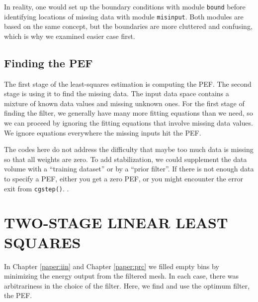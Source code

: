 \par
In reality, one would set up the boundary conditions
with module
\texttt{bound}
before identifying locations of missing data
with module
\texttt{misinput}.
Both modules are based on the same concept,
but the boundaries are more cluttered and confusing,
which is why we examined easier case first.


\subsection{Finding the PEF}

\par
The first stage of the least-squares estimation
is computing the PEF.
The second stage is using it to find the missing data.
The input data space contains a mixture of known data values
and missing unknown ones.
For the first stage of finding the filter,
we generally have many more fitting equations than we need,
so we can proceed by ignoring the fitting equations
that involve missing data values.
We ignore equations everywhere the missing inputs hit the PEF.

\par
The codes here do not address the difficulty that maybe
too much data is missing so that all weights are zero.
To add stabilization, we could supplement the data volume
with a ``training dataset''
or by a ``prior filter''.
If there is not enough data to specify a PEF,
either you get a zero PEF,
or you might encounter the error exit from \texttt{cgstep()}.
.




\section{TWO-STAGE LINEAR LEAST SQUARES}
In Chapter \ref{paper:iin} and
Chapter    \ref{paper:prc}
we filled empty bins
by minimizing the energy output from the filtered mesh.
In each case, there was arbitrariness in the choice of the filter.
Here, we find and use the optimum filter, the PEF.


